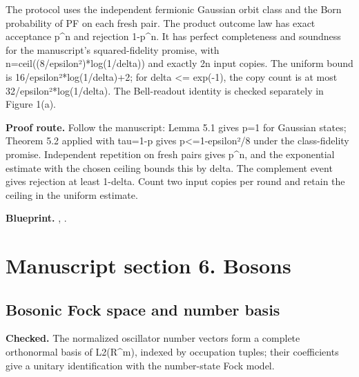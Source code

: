 The protocol uses the independent fermionic Gaussian orbit class and the Born probability of PF on each fresh pair. The product outcome law has exact acceptance p\textasciicircum{}n and rejection 1-p\textasciicircum{}n. It has perfect completeness and soundness for the manuscript’s squared-fidelity promise, with n=ceil((8/epsilon²)*log(1/delta)) and exactly 2n input copies. The uniform bound is 16/epsilon²*log(1/delta)+2; for delta <= exp(-1), the copy count is at most 32/epsilon²*log(1/delta). The Bell-readout identity is checked separately in Figure 1(a).

\textbf{Proof route.} Follow the manuscript: Lemma 5.1 gives p=1 for Gaussian states; Theorem 5.2 applied with tau=1-p gives p<=1-epsilon²/8 under the class-fidelity promise. Independent repetition on fresh pairs gives p\textasciicircum{}n, and the exponential estimate with the chosen ceiling bounds this by delta. The complement event gives rejection at least 1-delta. Count two input copies per round and retain the ceiling in the uniform estimate.


\textbf{Blueprint.} , .

\section{Manuscript section 6. Bosons}
\subsection{Bosonic Fock space and number basis}\label{paper:boson-fock}
\textbf{Checked.} The normalized oscillator number vectors form a complete orthonormal basis of L2(R\textasciicircum{}m), indexed by occupation tuples; their coefficients give a unitary identification with the number-state Fock model. 

